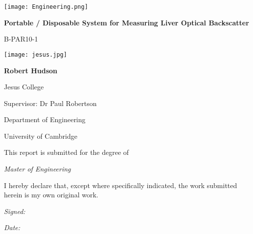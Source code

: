 \begin{titlepage}
\texttt{[image: Engineering.png]}\par
    \begin{centering}
        \vspace{1cm}
        {\huge\bfseries Portable / Disposable System for Measuring Liver Optical Backscatter\par}
        \vspace{0.5cm}
        {\Large B-PAR10-1}\par
        \vspace{1cm}
        \texttt{[image: jesus.jpg]}\par
        \vspace{1cm}
        {\Large\bfseries Robert Hudson}\par
        {\Large
        Jesus College\par
        \vspace{0.5cm}
        Supervisor: Dr Paul Robertson\par
        \vspace{0.5cm}
        Department of Engineering \par
        University of Cambridge \par
        \vspace{0.5cm}
        This report is submitted for the degree of \par
        {\em Master of Engineering}
        }

    \end{centering}
    \vfill

    {\footnotesize \noindent I hereby declare that, except where specifically indicated, the work submitted herein is my own original work.}\par
    \vspace{0.5cm}
    \begin{minipage}[t]{0.5\linewidth}
        {\small\textit{Signed:}\hrulefill}
    \end{minipage}
    \hfill
    \begin{minipage}[t]{0.3\linewidth}
        {\small\textit{Date:}}%
    \end{minipage}

\end{titlepage}